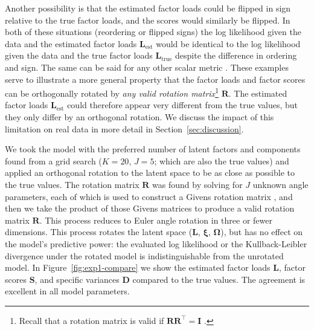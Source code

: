 \documentclass[twocolumn]{aastex62}
\newcommand{\vect}[1]{\boldsymbol{\mathbf{#1}}}
\renewcommand{\vec}[1]{\vect{#1}}
\newcommand{\transpose}{^\intercal}
\newcommand{\factorloads}{\textbf{L}}
\newcommand{\factorscores}{\textbf{S}}
\newcommand{\specificvariance}{\vec{D}}
\newcommand{\scoremeans}{\vec\xi}
\newcommand{\scorecovs}{\vec\Omega}
\newcommand{\NumLatentFactors}{J}
\newcommand{\NumComponents}{K}
\begin{document}
Another possibility is that the estimated factor loads could be flipped in sign 
relative to the true factor loads, and the scores would similarly be flipped. 
In both of these situations (reordering or flipped signs) the log likelihood 
given the data and the estimated factor loads $\factorloads_\textrm{est}$ 
would be identical to the log likelihood given the data and the true factor loads 
$\factorloads_\textrm{true}$
despite the difference in ordering and sign. The same can be said for any other
scalar metric \citep[e.g., Kullback-Leibler divergence;][]{Kullback:1951}.
These examples serve to illustrate a more 
general property that the factor loads and factor scores can be orthogonally 
rotated by \emph{any valid rotation matrix}\footnote{Recall that a rotation matrix is valid if 
$\vec{R}\vec{R}\transpose = \vec{I}\,\,$.} $\vec{R}$. The estimated factor loads 
$\factorloads_\textrm{est}$ could therefore appear very different from the true 
values, but they only differ by an orthogonal rotation. We discuss the impact of this limitation on real data in more detail in Section~\ref{sec:discussion}. 




We took the model with the preferred number of latent factors and components found
from a grid search ($\NumComponents = 20$, $\NumLatentFactors = 5$; which are also
the true values) and applied an orthogonal rotation to the latent space to be as
close as possible to the true values. The rotation matrix $\mathbf{R}$ was found
by solving for $\NumLatentFactors$ unknown angle parameters, each of which is used
to construct a Givens rotation matrix \citep{Givens:1958}, and then we take the product of those Givens
matrices to produce a valid rotation matrix $\vec{R}$. This process reduces to Euler angle rotation in three or fewer dimensions.
This process rotates the latent space
($\factorloads$, $\scoremeans$, $\scorecovs$), but has no effect on the model's 
predictive power: the evaluated log likelihood or the Kullback-Leibler divergence \citep{Kullback:1951} under the
rotated model is indistinguishable from the unrotated model.
In Figure~\ref{fig:exp1-compare} we show the estimated factor loads $\factorloads$,
factor scores $\factorscores$, and specific variances $\specificvariance$ compared
to the true values. The agreement is excellent in all model parameters.

\vspace{2em}

 
\end{document}
